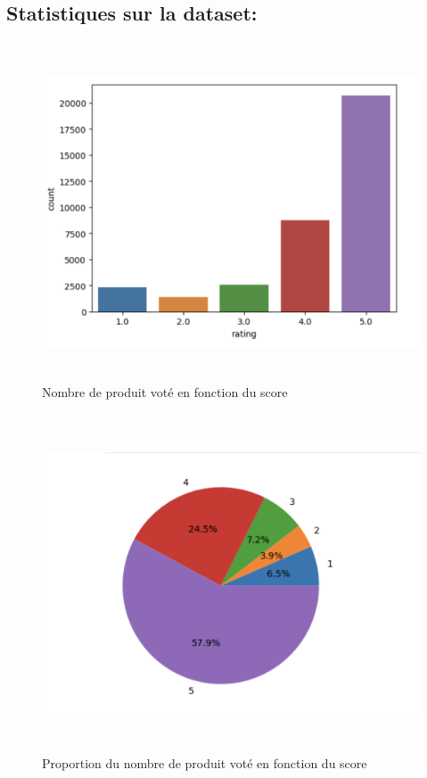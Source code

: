 \subsection{Statistiques sur la dataset:}
\begin{figure}[h]
\begin{center}
\includegraphics[width=15cm,height=10cm]{images/user_proportion.png}
\caption[Nombre de produit voté en fonction du score]{Nombre de produit voté en fonction du score}
\label{monlabel}
\end{center}
\end{figure}

\begin{figure}[h]
\begin{center}
\includegraphics[width=15cm,height=10cm]{images/pie_user_vote.png}
\caption[Proportion du nombre de produit voté en fonction du score]{Proportion du nombre de produit voté en fonction du score}
\label{monlabel}
\end{center}
\end{figure}
\newpage

